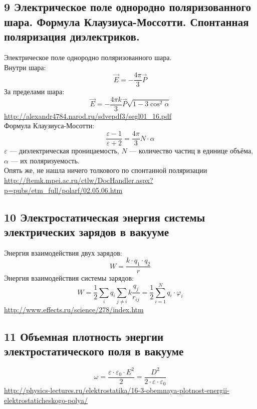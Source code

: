 \documentclass[a4paper,12pt]{article}
\begin{document}
\subsection{9   Электрическое поле однородно поляризованного шара. Формула Клаузиуса-Моссотти. Спонтанная поляризация диэлектриков.}
Электрическое поле однородно поляризованного шара. \\
Внутри шара: \\
\begin{equation}
        \vec{E} = - \frac{4 \pi}{3} \vec{P}
\end{equation}
За пределами шара:
\begin{equation}
        \vec{E} = - \frac{4 \pi k}{3} \vec{P} \sqrt{1 - 3 \cos^2 {\alpha}}
\end{equation}
\url{http://alexandr4784.narod.ru/sdvepdf3/segl01_16.pdf} \\
Формула Клаузиуса-Мосотти:\\
\begin{equation}
	\frac{\varepsilon - 1}{\varepsilon + 2} = \frac{4 \pi}{3} N \cdot \alpha
\end{equation}
$\varepsilon$ — диэлектрическая проницаемость, $N$ — количество частиц в единице объёма, $\alpha$ — их поляризуемость.\\
Опять же, не нашла ничего толкового по спонтанной поляризации\\
\url{http://ftemk.mpei.ac.ru/ctlw/DocHandler.aspx?p=pubs/etm_full/polarf/02.05.06.htm}

\subsection{10   Электростатическая энергия системы электрических зарядов в вакууме}
Энергия взаимодействия двух зарядов:\\
\begin{equation}
	W = \frac{k \cdot q_1 \cdot q_2}{r}
\end{equation}
Энергия взаимодействия системы зарядов:\\
\begin{equation}
	W = \frac{1}{2} \sum _i q_i \sum _{j \neq i} k \frac{q_j}{r_{ij}} = \frac{1}{2} \sum _{i = 1} ^N q_i \cdot \varphi _i
\end{equation}
\url{http://www.effects.ru/science/278/index.htm}

\subsection{11	Объемная плотность энергии электростатического поля в вакууме}
\begin{equation}
	\omega = \frac{\varepsilon \cdot \varepsilon _0 \cdot E^2}{2} = \frac{D^2}{2 \cdot \varepsilon \cdot \varepsilon _0}
\end{equation}
\url{http://physics-lectures.ru/elektrostatika/16-3-obemnaya-plotnost-energii-elektrostaticheskogo-polya/}
\end{document}
